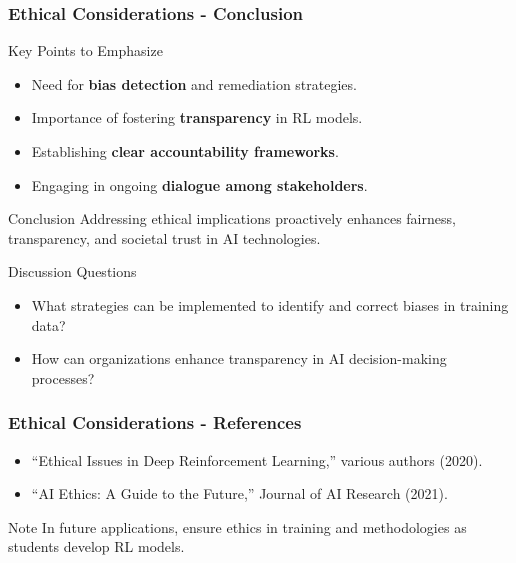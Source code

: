 \documentclass[aspectratio=169]{beamer}
\begin{document}
\begin{frame}[fragile]
    \frametitle{Ethical Considerations - Conclusion}
    \begin{block}{Key Points to Emphasize}
        \begin{itemize}
            \item Need for \textbf{bias detection} and remediation strategies.
            \item Importance of fostering \textbf{transparency} in RL models.
            \item Establishing \textbf{clear accountability frameworks}.
            \item Engaging in ongoing \textbf{dialogue among stakeholders}.
        \end{itemize}
    \end{block}
    
    \begin{block}{Conclusion}
        Addressing ethical implications proactively enhances fairness, transparency, and societal trust in AI technologies.
    \end{block}

    \begin{block}{Discussion Questions}
        \begin{itemize}
            \item What strategies can be implemented to identify and correct biases in training data?
            \item How can organizations enhance transparency in AI decision-making processes?
        \end{itemize}
    \end{block}
\end{frame}

\begin{frame}[fragile]
    \frametitle{Ethical Considerations - References}
    \begin{itemize}
        \item ``Ethical Issues in Deep Reinforcement Learning,'' various authors (2020).
        \item ``AI Ethics: A Guide to the Future,'' Journal of AI Research (2021).
    \end{itemize}
    
    \begin{block}{Note}
        In future applications, ensure ethics in training and methodologies as students develop RL models.
    \end{block}
\end{frame}
\end{document}

